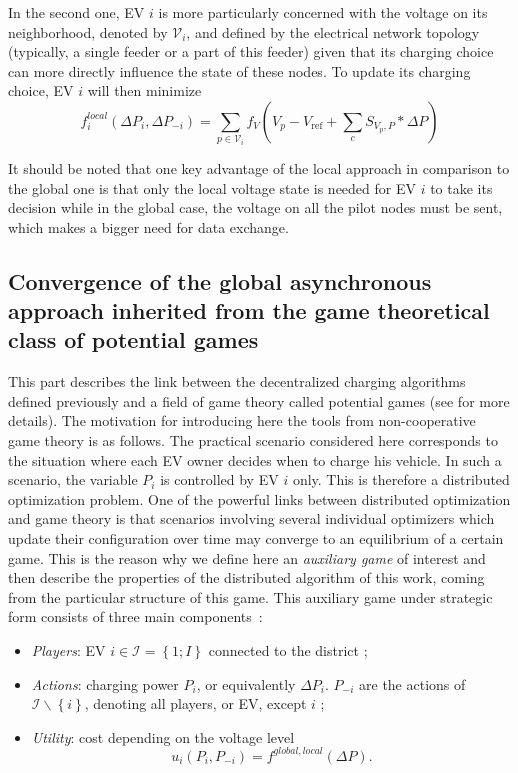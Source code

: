 \documentclass[journal]{IEEEtran}
\begin{document}
In the second one, EV $i$ is more particularly concerned with the voltage on its neighborhood, denoted by $\mathcal{V}_{i}$, and defined by the electrical network topology (typically, a single feeder or a part of this feeder) given that its charging choice can more directly influence the state of these nodes. To update its charging choice, EV $i$ will then minimize
\begin{equation}
f^{local}_i(\Delta P_{i},\Delta P_{-i})=\displaystyle \sum_{p \in \mathcal{V}_{i}} f_V(V_{p}-V_{\textrm{ref}}+\displaystyle \sum_{c}S_{V_{p},P} *\Delta P)
\end{equation}

It should be noted that one key advantage of the local approach in comparison to the global one is that only the local voltage state is needed for EV $i$ to take its decision while in the global case, the voltage on all the pilot nodes must be sent, which makes a bigger need for data exchange.

\subsection{Convergence of the global asynchronous approach inherited from the game theoretical class of potential games}


This part describes the link between the decentralized charging algorithms defined previously and a field of game theory called potential games (see \cite{beaude12} for more details). The motivation for introducing here the tools from non-cooperative game theory is as follows. The practical scenario considered here corresponds to the situation where each EV owner decides when to charge his vehicle. In such a scenario, the variable $P_i$ is controlled by EV $i$ only. This is therefore a distributed optimization problem. One of the powerful links between distributed optimization and game theory is that scenarios involving several individual optimizers which update their configuration over time may converge to an equilibrium of a certain game. This is the reason why we define here an \textit{auxiliary game} of interest and then describe the properties of the distributed algorithm of this work, coming from the particular structure of this game. This auxiliary game under strategic form consists of three main components~:

\begin{itemize}
\item \textit{Players}: EV $i \in \mathcal{I}=\left\{1;I\right\}$ connected to the district ;
\item \textit{Actions}: charging power $P_{i}$, or equivalently $\Delta P_i$. $P_{-i}$ are the actions of $\mathcal{I} \backslash \left\{i\right\}$, denoting all players, or EV, except $i$ ;
\item \textit{Utility}: cost depending on the voltage level
\begin{equation}
\label{PersonalCost}
u_{i}(P_{i},P_{-i})=f^{global,local}(\Delta P) \textrm{.}
\end{equation}
\end{itemize}
\end{document}
